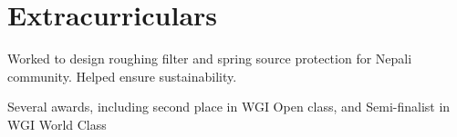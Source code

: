 \documentclass[]{deedy-resume-openfont}
\begin{document}
\begin{minipage}[t]{0.59\textwidth}
\sectionsep

\section{Extracurriculars}
\begin{tightemize}
\item Worked to design roughing filter and spring source protection for Nepali community.  Helped ensure sustainability.
\end{tightemize}
\sectionsep

\begin{tightemize}
\item Several awards, including second place in WGI Open class, and Semi-finalist in WGI World Class
\end{tightemize}
\sectionsep



\end{minipage} 
\end{document}

